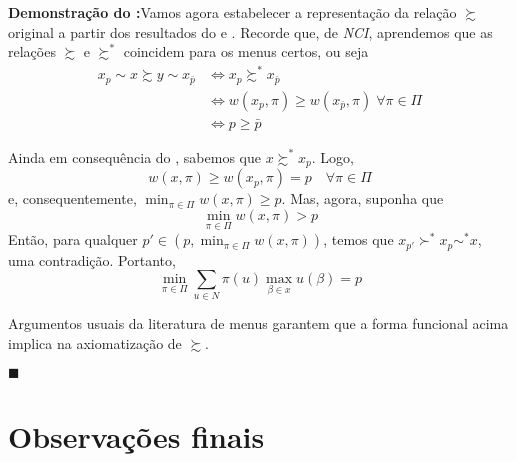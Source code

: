 \documentclass[11pt, a4paper]{article}
\theoremstyle{nonumberplain}
\theoremstyle{plain}
\theoremstyle{plain}
\theoremstyle{plain}
\begin{document}
\noindent
\textbf{Demonstração do :}Vamos agora estabelecer a representação da relação $\succsim$ original a partir dos resultados do  e . Recorde que, de \emph{NCI}, aprendemos que as relações $\succsim$ e $\succsim^*$ coincidem para os menus certos, ou seja
\begin{align*}
x_p\sim x\succsim y\sim x_{\bar{p}}&\Leftrightarrow x_p\succsim^* x_{\bar{p}}\\
&\Leftrightarrow w(x_p,\pi)\geq w(x_{\bar{p}},\pi)\; \forall\pi\in\Pi \\
&\Leftrightarrow p\geq \bar{p}
\end{align*}

Ainda em consequência do , sabemos que $x\succsim^* x_p$. Logo, $$w(x,\pi)\geq w(x_p,\pi)=p\quad\forall\pi \in \Pi$$ e, consequentemente, $\min_{\pi\in\Pi}w(x,\pi)\geq p$. Mas, agora, suponha que $$\min_{\pi\in\Pi}w(x,\pi)> p$$ Então, para qualquer $p'\in (p,\min_{\pi\in\Pi}w(x,\pi))$, temos que $x_{p'}\succ^* x_p\sim^* x$, uma contradição. Portanto, $$\min_{\pi\in\Pi}\sum_{u\in N} \pi(u)\max_{\beta\in x}u(\beta)=p$$   

Argumentos usuais da literatura de menus garantem que a forma funcional acima implica na axiomatização de $\succsim$. 
\begin{flushright}
$\blacksquare$
\end{flushright}

\section{Observações finais}



\end{document}
